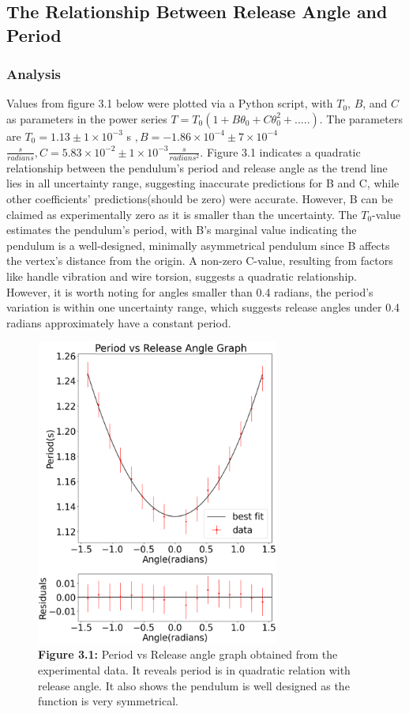 \documentclass[11pt,titlepage,a4paper,twocolumn]{article}
\begin{document}
{    \subsection{The Relationship Between Release Angle and Period}
        \subsubsection{Analysis}
            \hspace{\parindent}\hspace{\parindent}Values from figure 3.1 below were plotted via a Python script, with $T_0$, $B$, and $C$ as parameters in the power series $T = T_0(1 + B\theta_0 + C\theta_0^2 + .....)$. The parameters are $T_0 = 1.13  \pm 1\times10^{-3} $ s $, B = -1.86\times10^{-4}  \pm 7\times10^{-4}$ $\frac{s}{radians}, C = 5.83\times10^{-2} \pm 1\times10^{-3} \frac{s}{radians^2}$. Figure 3.1 indicates a quadratic relationship between the pendulum's period and release angle as the trend line lies in all uncertainty range, suggesting inaccurate predictions for B and C, while other coefficients’ predictions(should be zero) were accurate. However, B can be claimed as experimentally zero as it is smaller than the uncertainty. The $T_0$-value estimates the pendulum’s period, with B's marginal value indicating the pendulum is a well-designed, minimally asymmetrical pendulum since B affects the vertex’s distance from the origin. A non-zero C-value, resulting from factors like handle vibration and wire torsion, suggests a quadratic relationship. However, it is worth noting for angles smaller than 0.4 radians, the period's variation is within one uncertainty range, which suggests release angles under 0.4 radians approximately have a constant period.
            \begin{figure}[H]
                \centering
                \includegraphics[width=8cm]{3.1.png}
                \caption*{\textbf{Figure 3.1:} Period vs Release angle graph obtained from the experimental data. It reveals period is in quadratic relation with release angle. It also shows the pendulum is well designed as the function is very symmetrical.}
                \label{fig:enter-label}
            \end{figure}
}
\end{document}
